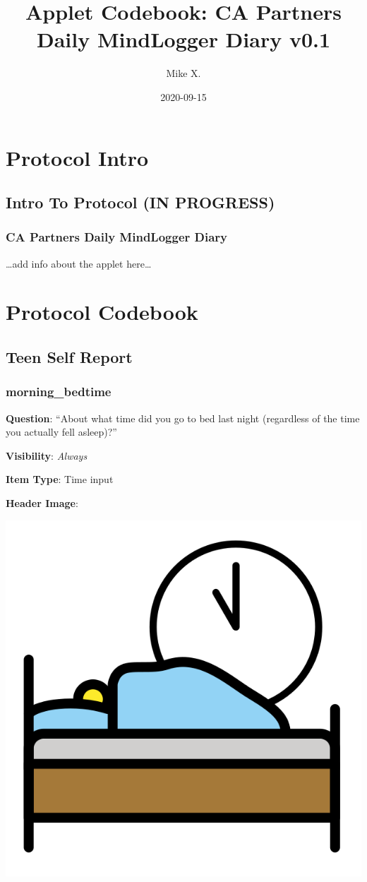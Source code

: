 \documentclass[]{book}
\title{Applet Codebook: CA Partners Daily MindLogger Diary v0.1}
\author{Mike X.}
\date{2020-09-15}
\begin{document}
\maketitle

{
\setcounter{tocdepth}{1}
\tableofcontents
}
\hypertarget{part-protocol-intro}{%
\part{Protocol Intro}\label{part-protocol-intro}}

\hypertarget{intro}{%
\chapter*{Intro To Protocol (IN PROGRESS)}\label{intro}}

\hypertarget{ca-partners-daily-mindlogger-diary}{%
\section{CA Partners Daily MindLogger Diary}\label{ca-partners-daily-mindlogger-diary}}

\ldots{}add info about the applet here\ldots{}

\hypertarget{part-protocol-codebook}{%
\part{Protocol Codebook}\label{part-protocol-codebook}}

\hypertarget{teen_section}{%
\chapter{Teen Self Report}\label{teen_section}}

\hypertarget{morning_bedtime}{%
\section{morning\_bedtime}\label{morning_bedtime}}

\textbf{Question}: ``About what time did you go to bed last night (regardless of the time you actually fell asleep)?''

\textbf{Visibility}: \emph{Always}

\textbf{Item Type}: Time input

\textbf{Header Image}:

\begin{flushleft}\includegraphics[width=0.33\linewidth]{downloadFigs4latex_ca_partners_applet_codebook/morning_bedtime_headerImg} \end{flushleft}
\end{document}
